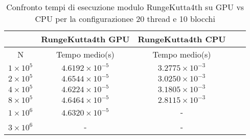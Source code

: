 \begin{table}[ht!]
    \begin{center}
        \renewcommand{\arraystretch}{1.5}
        \begin{adjustbox}{width=.51\textwidth}
            \begin{tabular}{ |c|c|c|c|c| }
                \hline
                \multicolumn{1}{|c}{} & \multicolumn{1}{|c}{RungeKutta4th GPU} & \multicolumn{1}{|c|}{RungeKutta4th CPU} \\
                \hline
                 N & Tempo medio(s) & Tempo medio(s) \\
                \hline 
                $1 \times 10^5$ & $4.6192 \times 10^{-5}$ & $3.2775 \times 10^{-3}$ \\ 
                \hline 
                $2 \times 10^5$ & $4.6544 \times 10^{-5}$ & $3.0250 \times 10^{-3}$ \\ 
                \hline 
                $4 \times 10^5$ & $4.6224 \times 10^{-5}$ & $3.1805 \times 10^{-3}$ \\ 
                \hline 
                $8 \times 10^5$ & $4.6464 \times 10^{-5}$ & $2.8115 \times 10^{-3}$ \\ 
                \hline 
                $1 \times 10^6$ & $4.6320 \times 10^{-5}$ & - \\ 
                \hline 
                 $3 \times 10^6$ & - & - \\ 
                \hline 
            \end{tabular}
        \end{adjustbox}
    \end{center}
    \caption{Confronto tempi di esecuzione modulo RungeKutta4th su GPU vs CPU per la configurazionee 20 thread e 10 blocchi}
    \label{tab:rk4_kernel_table_20x10}
\end{table}

